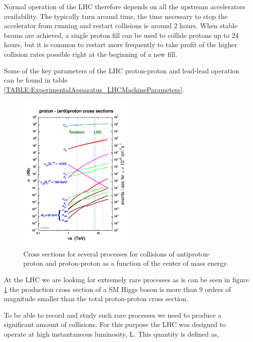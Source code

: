 Normal operation of the \gls{LHC} therefore depends on all the upstream accelerators availability. The typically turn around time, the time necessary to stop the accelerator from running and restart collisions is around 2 hours. When stable beams are achieved, a single proton fill can be used to collide protons up to 24 hours, but it is common to restart more frequently to take profit of the higher collision rates possible right at the beginning of a new fill.

Some of the key parameters of the LHC proton-proton and lead-lead operation can be found in table \ref{TABLE:ExperimentalApparatus_LHCMachineParameters}.




\begin{figure}[!htb]
  \centering
  \includegraphics[width=0.50\textwidth]{Chapter02/LHC/Images/crosssections2012_v5}
  \caption{Cross sections for several processes for collisions of antiproton-proton and proton-proton as a function of the center of mass energy\cite{ARTICLE:TheCMSExperiment}.}
  \label{FIGURE:ExperimentalApparatus_LHCCrossSections}
\end{figure}

At the \gls{LHC} we are looking for extremely rare processes as is can be seen in figure \ref{FIGURE:ExperimentalApparatus_LHCCrossSections} the production cross section of a \gls{SM} Higgs boson is more than 9 orders of magnitude smaller than the total proton-proton cross section. 

To be able to record and study such rare processes we need to produce a significant amount of collisions. For this purpose the LHC was designed to operate at high instantaneous luminosity, L. This quantity is defined as,

